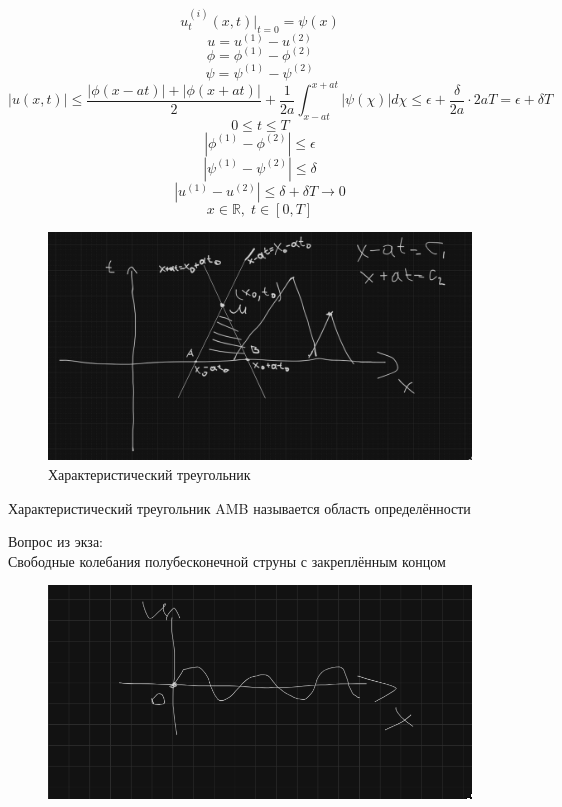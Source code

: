\documentclass[a4paper]{article}
\begin{document}
\[
    u_{t}^{(i)}(x,t) |_{t=0} = \psi(x)
\]
\[
    u = u^{(1)} - u^{(2)}
\]
\[
    \phi = \phi^{(1)} - \phi^{(2)}
\]
\[
    \psi = \psi^{(1)} - \psi^{(2)}
\]
\[
    |u(x,t)| \leq \frac{|\phi(x-at)|+|\phi(x+at)|}{2} + \frac{1}{2a} 
    \int_{x-at}^{x+at} |\psi(\chi)| d\chi \leq \epsilon + \frac{\delta}{2a} \cdot
    2aT = \epsilon + \delta T
\]
\[
    0 \leq t \leq T
\]
\[
    | \phi^{(1)} - \phi^{(2)} | \leq \epsilon
\]
\[
    | \psi^{(1)} - \psi^{(2)} | \leq \delta
\]
\[
    |u^{(1)} - u^{(2)}| \leq \delta + \delta T \rightarrow 0
\]
\[
    x \in \mathbb{R}, \; t \in [0,T]
\]
\begin{figure}[!htb]
    \centering
    \includegraphics[scale=0.3]{figures/mp-lec4-10-fig2.png}
    \caption{Характеристический треугольник}
\end{figure}

Характеристический треугольник AMB называется область определённости

Вопрос из экза:\\
Свободные колебания полубесконечной струны с закреплённым концом

\begin{figure}[!htb]
    \centering
    \includegraphics[scale=0.3]{figures/mp-lec4-10-fig3.png}
\end{figure}
\end{document}
